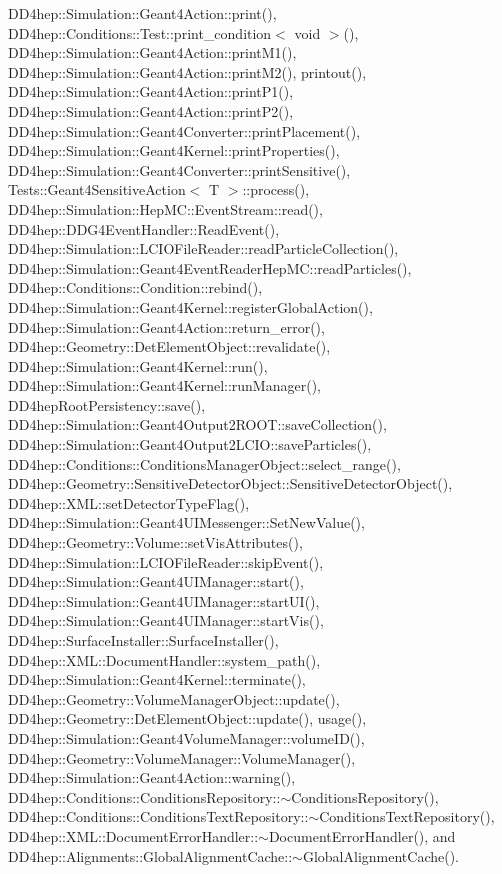 D\+D4hep\+::\+Simulation\+::\+Geant4\+Action\+::print(), D\+D4hep\+::\+Conditions\+::\+Test\+::print\+\_\+condition$<$ void $>$(), D\+D4hep\+::\+Simulation\+::\+Geant4\+Action\+::print\+M1(), D\+D4hep\+::\+Simulation\+::\+Geant4\+Action\+::print\+M2(), printout(), D\+D4hep\+::\+Simulation\+::\+Geant4\+Action\+::print\+P1(), D\+D4hep\+::\+Simulation\+::\+Geant4\+Action\+::print\+P2(), D\+D4hep\+::\+Simulation\+::\+Geant4\+Converter\+::print\+Placement(), D\+D4hep\+::\+Simulation\+::\+Geant4\+Kernel\+::print\+Properties(), D\+D4hep\+::\+Simulation\+::\+Geant4\+Converter\+::print\+Sensitive(), Tests\+::\+Geant4\+Sensitive\+Action$<$ T $>$\+::process(), D\+D4hep\+::\+Simulation\+::\+Hep\+M\+C\+::\+Event\+Stream\+::read(), D\+D4hep\+::\+D\+D\+G4\+Event\+Handler\+::\+Read\+Event(), D\+D4hep\+::\+Simulation\+::\+L\+C\+I\+O\+File\+Reader\+::read\+Particle\+Collection(), D\+D4hep\+::\+Simulation\+::\+Geant4\+Event\+Reader\+Hep\+M\+C\+::read\+Particles(), D\+D4hep\+::\+Conditions\+::\+Condition\+::rebind(), D\+D4hep\+::\+Simulation\+::\+Geant4\+Kernel\+::register\+Global\+Action(), D\+D4hep\+::\+Simulation\+::\+Geant4\+Action\+::return\+\_\+error(), D\+D4hep\+::\+Geometry\+::\+Det\+Element\+Object\+::revalidate(), D\+D4hep\+::\+Simulation\+::\+Geant4\+Kernel\+::run(), D\+D4hep\+::\+Simulation\+::\+Geant4\+Kernel\+::run\+Manager(), D\+D4hep\+Root\+Persistency\+::save(), D\+D4hep\+::\+Simulation\+::\+Geant4\+Output2\+R\+O\+O\+T\+::save\+Collection(), D\+D4hep\+::\+Simulation\+::\+Geant4\+Output2\+L\+C\+I\+O\+::save\+Particles(), D\+D4hep\+::\+Conditions\+::\+Conditions\+Manager\+Object\+::select\+\_\+range(), D\+D4hep\+::\+Geometry\+::\+Sensitive\+Detector\+Object\+::\+Sensitive\+Detector\+Object(), D\+D4hep\+::\+X\+M\+L\+::set\+Detector\+Type\+Flag(), D\+D4hep\+::\+Simulation\+::\+Geant4\+U\+I\+Messenger\+::\+Set\+New\+Value(), D\+D4hep\+::\+Geometry\+::\+Volume\+::set\+Vis\+Attributes(), D\+D4hep\+::\+Simulation\+::\+L\+C\+I\+O\+File\+Reader\+::skip\+Event(), D\+D4hep\+::\+Simulation\+::\+Geant4\+U\+I\+Manager\+::start(), D\+D4hep\+::\+Simulation\+::\+Geant4\+U\+I\+Manager\+::start\+U\+I(), D\+D4hep\+::\+Simulation\+::\+Geant4\+U\+I\+Manager\+::start\+Vis(), D\+D4hep\+::\+Surface\+Installer\+::\+Surface\+Installer(), D\+D4hep\+::\+X\+M\+L\+::\+Document\+Handler\+::system\+\_\+path(), D\+D4hep\+::\+Simulation\+::\+Geant4\+Kernel\+::terminate(), D\+D4hep\+::\+Geometry\+::\+Volume\+Manager\+Object\+::update(), D\+D4hep\+::\+Geometry\+::\+Det\+Element\+Object\+::update(), usage(), D\+D4hep\+::\+Simulation\+::\+Geant4\+Volume\+Manager\+::volume\+I\+D(), D\+D4hep\+::\+Geometry\+::\+Volume\+Manager\+::\+Volume\+Manager(), D\+D4hep\+::\+Simulation\+::\+Geant4\+Action\+::warning(), D\+D4hep\+::\+Conditions\+::\+Conditions\+Repository\+::$\sim$\+Conditions\+Repository(), D\+D4hep\+::\+Conditions\+::\+Conditions\+Text\+Repository\+::$\sim$\+Conditions\+Text\+Repository(), D\+D4hep\+::\+X\+M\+L\+::\+Document\+Error\+Handler\+::$\sim$\+Document\+Error\+Handler(), and D\+D4hep\+::\+Alignments\+::\+Global\+Alignment\+Cache\+::$\sim$\+Global\+Alignment\+Cache().

